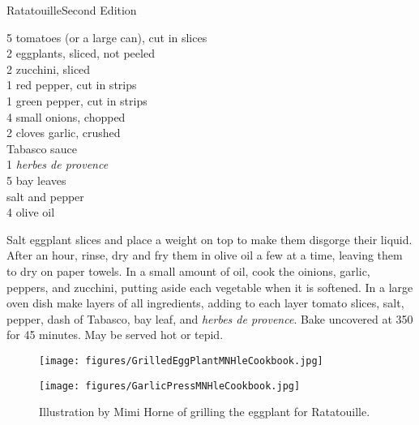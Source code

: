 \begin{entry}{Ratatouille}{Second Edition}
\begin{open}
\end{open}
\begin{ingredients}
  5 tomatoes (or a large can), cut in slices\\
  2 eggplants, sliced, not peeled \\
  2 zucchini, sliced \\
  1 red pepper, cut in strips \\
  1 green pepper, cut in strips \\
  4 small onions, chopped \\
  2 cloves garlic, crushed \\
  Tabasco sauce \\
  \SI{1}{\tblspoon} \emph{herbes de provence} \\
  5 bay leaves \\
  salt and pepper \\
  \SI{4}{\tblspoon} olive oil \\
  
\end{ingredients}

Salt eggplant slices and place a weight on top to make them disgorge their liquid. After an hour, rinse, dry and fry them in olive oil a few at a time, leaving them to dry on paper towels. In a small amount of oil, cook the oinions, garlic, peppers, and zucchini, putting aside each vegetable when it is softened. In a large oven dish make layers of all ingredients, adding to each layer tomato slices, salt, pepper, dash of Tabasco, bay leaf, and \emph{herbes de provence}. Bake uncovered at \SI{350}{\degreeF} for 45 minutes. May be served hot or tepid. 

\begin{figure}
  \centering
  \texttt{[image: figures/GrilledEggPlantMNHleCookbook.jpg]}
  \caption{}
  \label{fig:mimi_eggplant}
\end{figure}

\begin{figure}
  \centering
  \texttt{[image: figures/GarlicPressMNHleCookbook.jpg]}
  \caption{Illustration by Mimi Horne of grilling the eggplant for Ratatouille.}
  \label{fig:mimi_garlic}
\end{figure}

\end{entry}

